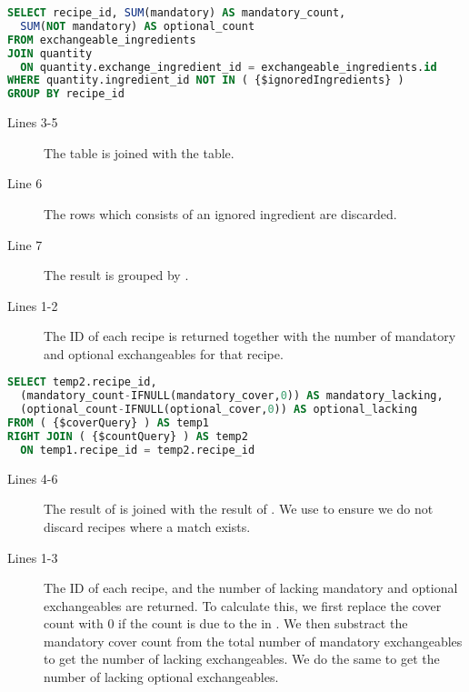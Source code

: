 \begin{lstlisting}[language=SQL, float=h, label={}, caption={\$countQuery, count the number of mandatory and optional exchangeables.}]
SELECT recipe_id, SUM(mandatory) AS mandatory_count,
  SUM(NOT mandatory) AS optional_count
FROM exchangeable_ingredients
JOIN quantity
  ON quantity.exchange_ingredient_id = exchangeable_ingredients.id
WHERE quantity.ingredient_id NOT IN ( {$ignoredIngredients} )
GROUP BY recipe_id
\end{lstlisting}

\begin{description}
\item[Lines 3-5] The  table is joined with the  table.
\item[Line 6] The rows which consists of an ignored ingredient are discarded.
\item[Line 7] The result is grouped by .
\item[Lines 1-2] The ID of each recipe is returned together with the number of mandatory and optional exchangeables for that recipe.
\end{description}



\begin{lstlisting}[language=SQL, morekeywords={IFNULL}, float=h, label={}, caption={\$lackingQuery, get the lacking ingredients count.}]
SELECT temp2.recipe_id,
  (mandatory_count-IFNULL(mandatory_cover,0)) AS mandatory_lacking,
  (optional_count-IFNULL(optional_cover,0)) AS optional_lacking
FROM ( {$coverQuery} ) AS temp1
RIGHT JOIN ( {$countQuery} ) AS temp2
  ON temp1.recipe_id = temp2.recipe_id
\end{lstlisting}

\begin{description}
\item[Lines 4-6] The result of  is joined with the result of . We use  to ensure we do not discard recipes where a match exists. 
\item[Lines 1-3] The ID of each recipe, and the number of lacking mandatory and optional exchangeables are returned. To calculate this, we first replace the cover count with 0 if the count is  due to the  in . We then substract the mandatory cover count from the total number of mandatory exchangeables to get the number of lacking exchangeables. We do the same to get the number of lacking optional exchangeables.
\end{description}



